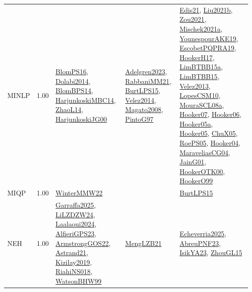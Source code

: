 {\begin{longtable}{p{3cm}r>{\raggedright\arraybackslash}p{6cm}>{\raggedright\arraybackslash}p{6cm}>{\raggedright\arraybackslash}p{8cm}}
\index{MINLP}\index{Algorithms!MINLP}MINLP &  1.00 & \hyperref[detail:BlomPS16]{BlomPS16}, \hyperref[detail:Dolabi2014]{Dolabi2014}, \hyperref[detail:BlomBPS14]{BlomBPS14}, \hyperref[detail:HarjunkoskiMBC14]{HarjunkoskiMBC14}, \hyperref[detail:ZhaoL14]{ZhaoL14}, \hyperref[detail:HarjunkoskiJG00]{HarjunkoskiJG00} & \hyperref[detail:Adelgren2023]{Adelgren2023}, \hyperref[detail:RabbaniMM21]{RabbaniMM21}, \hyperref[detail:BurtLPS15]{BurtLPS15}, \hyperref[detail:Velez2014]{Velez2014}, \hyperref[detail:Magato2008]{Magato2008}, \hyperref[detail:PintoG97]{PintoG97} & \hyperref[detail:Edis21]{Edis21}, \hyperref[detail:Liu2021b]{Liu2021b}, \hyperref[detail:Zou2021]{Zou2021}, \hyperref[detail:Mischek2021a]{Mischek2021a}, \hyperref[detail:YounespourAKE19]{YounespourAKE19}, \hyperref[detail:EscobetPQPRA19]{EscobetPQPRA19}, \hyperref[detail:HookerH17]{HookerH17}, \hyperref[detail:LimBTBB15a]{LimBTBB15a}, \hyperref[detail:LimBTBB15]{LimBTBB15}, \hyperref[detail:Velez2013]{Velez2013}, \hyperref[detail:LopesCSM10]{LopesCSM10}, \hyperref[detail:MouraSCL08a]{MouraSCL08a}, \hyperref[detail:Hooker07]{Hooker07}, \hyperref[detail:Hooker06]{Hooker06}, \hyperref[detail:Hooker05a]{Hooker05a}, \hyperref[detail:Hooker05]{Hooker05}, \hyperref[detail:ChuX05]{ChuX05}, \hyperref[detail:RoePS05]{RoePS05}, \hyperref[detail:Hooker04]{Hooker04}, \hyperref[detail:MaraveliasCG04]{MaraveliasCG04}, \hyperref[detail:JainG01]{JainG01}, \hyperref[detail:HookerOTK00]{HookerOTK00}, \hyperref[detail:HookerO99]{HookerO99}\\
\index{MIQP}\index{Algorithms!MIQP}MIQP &  1.00 & \hyperref[detail:WinterMMW22]{WinterMMW22} &  & \hyperref[detail:BurtLPS15]{BurtLPS15}\\
\index{NEH}\index{Algorithms!NEH}NEH &  1.00 & \hyperref[detail:Garraffa2025]{Garraffa2025}, \hyperref[detail:LiLZDZW24]{LiLZDZW24}, \hyperref[detail:Laalaoui2024]{Laalaoui2024}, \hyperref[detail:AlfieriGPS23]{AlfieriGPS23}, \hyperref[detail:ArmstrongGOS22]{ArmstrongGOS22}, \hyperref[detail:Astrand21]{Astrand21}, \hyperref[detail:Kizilay2019]{Kizilay2019}, \hyperref[detail:RiahiNS018]{RiahiNS018}, \hyperref[detail:WatsonBHW99]{WatsonBHW99} & \hyperref[detail:MengLZB21]{MengLZB21} & \hyperref[detail:Echeverria2025]{Echeverria2025}, \hyperref[detail:AbreuPNF23]{AbreuPNF23}, \hyperref[detail:IsikYA23]{IsikYA23}, \hyperref[detail:ZhouGL15]{ZhouGL15}\\

\end{longtable}}
